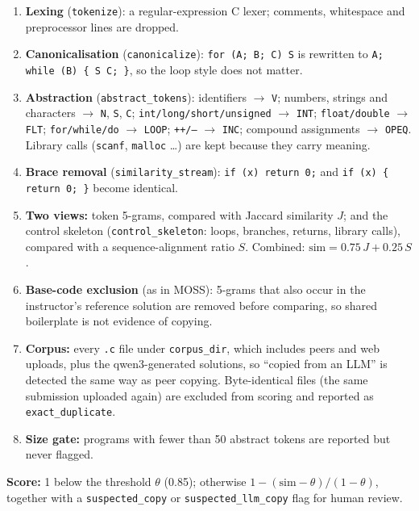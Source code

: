 \documentclass[11pt,a4paper]{article}
\newcommand{\fn}[1]{\nolinkurl{#1}}
\begin{document}
\begin{enumerate}
  \item \textbf{Lexing} (\fn{tokenize}): a regular-expression C lexer; comments, whitespace and preprocessor lines are dropped.
  \item \textbf{Canonicalisation} (\fn{canonicalize}): \texttt{for (A; B; C) S} is rewritten to
        \texttt{A; while (B) \{ S C; \}}, so the loop style does not matter.
  \item \textbf{Abstraction} (\fn{abstract_tokens}): identifiers $\rightarrow$ \texttt{V}; numbers, strings and characters
        $\rightarrow$ \texttt{N}, \texttt{S}, \texttt{C}; \texttt{int/long/short/unsigned} $\rightarrow$ \texttt{INT};
        \texttt{float/double} $\rightarrow$ \texttt{FLT}; \texttt{for/while/do} $\rightarrow$ \texttt{LOOP};
        \texttt{++/--} $\rightarrow$ \texttt{INC}; compound assignments $\rightarrow$ \texttt{OPEQ}. Library calls
        (\texttt{scanf}, \texttt{malloc} \ldots) are kept because they carry meaning.
  \item \textbf{Brace removal} (\fn{similarity_stream}): \texttt{if (x) return 0;} and \texttt{if (x) \{ return 0; \}} become identical.
  \item \textbf{Two views:} token 5-grams, compared with Jaccard similarity $J$; and the control skeleton
        (\fn{control_skeleton}: loops, branches, returns, library calls), compared with a sequence-alignment ratio $S$.
        Combined: $\text{sim} = 0.75\,J + 0.25\,S$.
  \item \textbf{Base-code exclusion} (as in MOSS): 5-grams that also occur in the instructor's reference solution
        are removed before comparing, so shared boilerplate is not evidence of copying.
  \item \textbf{Corpus:} every \texttt{.c} file under \texttt{corpus\_dir}, which includes peers and web uploads, plus the
        qwen3-generated solutions, so ``copied from an LLM'' is detected the same way as peer copying.
        Byte-identical files (the same submission uploaded again) are excluded from scoring and reported as
        \texttt{exact\_duplicate}.
  \item \textbf{Size gate:} programs with fewer than 50 abstract tokens are reported but never flagged.
\end{enumerate}

\textbf{Score:} 1 below the threshold $\theta$ (0.85); otherwise $1 - (\text{sim}-\theta)/(1-\theta)$, together with a
\texttt{suspected\_copy} or \texttt{suspected\_llm\_copy} flag for human review.
\end{document}
